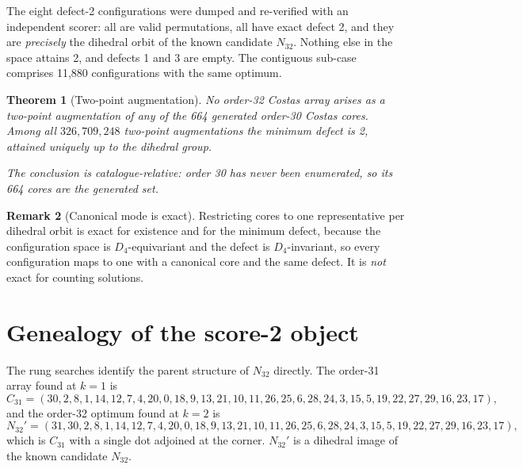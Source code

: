 \documentclass[11pt,a4paper,oneside]{report}
\newtheorem{theorem}{Theorem}[chapter]
\theoremstyle{definition}
\newtheorem{remark}[theorem]{Remark}
\begin{document}
The eight defect-2 configurations were dumped and re-verified with an
independent scorer: all are valid permutations, all have exact defect 2, and
they are \emph{precisely} the dihedral orbit of the known candidate $N_{32}$.
Nothing else in the space attains 2, and defects 1 and 3 are empty. The
contiguous sub-case comprises 11{,}880 configurations with the same optimum.

\begin{theorem}[Two-point augmentation]
\label{p2-thm:rungs}
No order-32 Costas array arises as a two-point augmentation of any of the 664 generated order-30
Costas cores. Among all $326{,}709{,}248$ two-point augmentations the minimum defect is 2, attained
uniquely up to the dihedral group.

The conclusion is catalogue-relative: order 30 has never been enumerated, so its 664 cores are the
generated set.
\end{theorem}

\begin{remark}[Canonical mode is exact]
Restricting cores to one representative per dihedral orbit is exact for
existence and for the minimum defect, because the configuration space is
$D_4$-equivariant and the defect is $D_4$-invariant, so every configuration maps
to one with a canonical core and the same defect. It is \emph{not} exact for
counting solutions.
\end{remark}

\section{Genealogy of the score-2 object}
\label{p2-sec:genealogy}

The rung searches identify the parent structure of $N_{32}$ directly. The
order-31 array found at $k=1$ is
{\footnotesize\[
C_{31} = (30,2,8,1,14,12,7,4,20,0,18,9,13,21,10,11,26,25,6,28,24,3,15,5,19,22,27,29,16,23,17),
\]}
and the order-32 optimum found at $k=2$ is
{\footnotesize\[
N_{32}' = (31,30,2,8,1,14,12,7,4,20,0,18,9,13,21,10,11,26,25,6,28,24,3,15,5,19,22,27,29,16,23,17),
\]}
which is $C_{31}$ with a single dot adjoined at the corner. $N_{32}'$ is a
dihedral image of the known candidate $N_{32}$.
\end{document}
